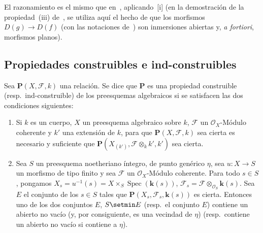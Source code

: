 El razonamiento es el mismo que en~, aplicando~[i] (en la demostración de la propiedad~(iii) de~, se utiliza aquí el hecho de que los morfismos $D(g)\to D(f)$ (con las notaciones de~) son inmersiones abiertas y, \emph{a fortiori}, morfismos planos).

\subsection{Propiedades construibles e ind-construibles}
\label{subsection:IV.9.2}
\label{IV.9.2}

\begin{definition}[9.2.1]
\label{IV.9.2.1}
Sea $\boldsymbol{P}(X,\mathcal F,k)$ una relación.
Se dice que $\boldsymbol{P}$ es una propiedad construible (\textup{resp.}\ ind-construible) de los preesquemas algebraicos si se satisfacen las dos condiciones siguientes:
\begin{enumerate}[label=\textup{(\roman*)}]
  \item Si $k$ es un cuerpo, $X$ un preesquema algebraico sobre $k$, $\mathcal F$ un $\mathcal O_X$-Módulo coherente y $k'$ una extensión de $k$, para que $\boldsymbol{P}(X,\mathcal F,k)$ sea cierta es necesario y suficiente que $\boldsymbol{P}(X_{(k')},\mathcal F\otimes_k k',k')$ sea cierta.
  \item Sea $S$ un preesquema noetheriano íntegro, de punto genérico $\eta$, sea $u:X\to S$ un morfismo de tipo finito y sea $\mathcal F$ un $\mathcal O_X$-Módulo coherente.
Para todo $s\in S$, pongamos $X_s=u^{-1}(s)=X\times_S\operatorname{Spec}(\boldsymbol{k}(s))$, $\mathcal F_s=\mathcal F\otimes_{\mathcal O_S}\boldsymbol{k}(s)$.
Sea $E$ el conjunto de los $s\in S$ tales que $\boldsymbol{P}(X_s,\mathcal F_s,\boldsymbol{k}(s))$ es cierta.
Entonces uno de los dos conjuntos $E$, $S\setmin E$ (\textup{resp.}\ el conjunto $E$) contiene un abierto no vacío \textup{(y, por consiguiente, es una vecindad de $\eta$)} (\textup{resp.}\ contiene un abierto no vacío si contiene a $\eta$).
\end{enumerate}
\end{definition}


